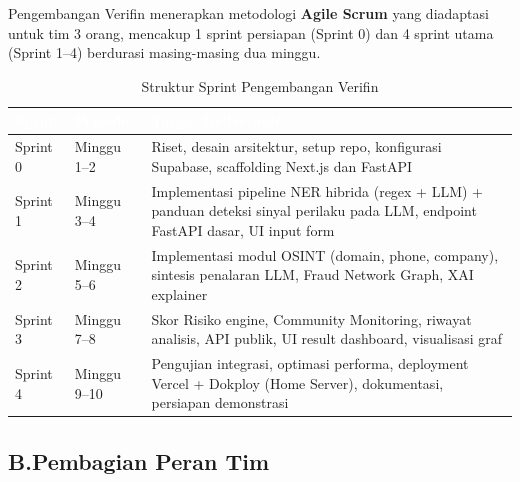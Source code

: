\documentclass[12pt,a4paper]{article}
\newcommand{\thead}[1]{\textcolor{white}{\textbf{#1}}}
\begin{document}
Pengembangan Verifin menerapkan metodologi \textbf{Agile Scrum} yang diadaptasi untuk tim 3 orang, mencakup 1 sprint persiapan (Sprint 0) dan 4 sprint utama (Sprint 1--4) berdurasi masing-masing dua minggu.

\begin{adjustwidth}{0.50cm}{0pt}
\begin{table}[H]
\centering
\caption{Struktur Sprint Pengembangan Verifin}
\label{tab:sprint-structure}
\small
\begin{tabularx}{\linewidth}{@{}p{2.0cm}p{2.6cm}Y@{}}
\toprule
{}\thead{Sprint} & \thead{Periode} & \thead{Target Deliverable} \\
\midrule
{}
Sprint 0 & Minggu 1--2 & Riset, desain arsitektur, setup repo, konfigurasi Supabase, scaffolding Next.js dan FastAPI \\
Sprint 1 & Minggu 3--4 & Implementasi pipeline NER hibrida (regex + LLM) + panduan deteksi sinyal perilaku pada LLM, endpoint FastAPI dasar, UI input form \\
Sprint 2 & Minggu 5--6 & Implementasi modul OSINT (domain, phone, company), sintesis penalaran LLM, Fraud Network Graph, XAI explainer \\
Sprint 3 & Minggu 7--8 & Skor Risiko engine, Community Monitoring, riwayat analisis, API publik, UI result dashboard, visualisasi graf \\
Sprint 4 & Minggu 9--10 & Pengujian integrasi, optimasi performa, deployment Vercel + Dokploy (Home Server), dokumentasi, persiapan demonstrasi \\
\bottomrule
\end{tabularx}
\end{table}
\end{adjustwidth}

\subsection*{B.\quad Pembagian Peran Tim}
\end{document}
